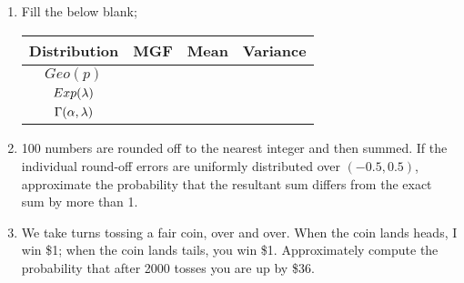 \documentclass[12pt]{article}%
\newcommand{\0}{{\bf 0}}
\begin{document}
\begin{enumerate}
















\item
Fill the below blank;
{\small
\begin{table}[H]    \center
\begin{tabular}{|c|c|c|c|} \hline
Distribution&MGF&Mean&Variance\\ \hline \hline
$Geo(p)$&&&\\\hline
$Exp(\lambda)$&&&\\\hline
$\Gamma(\alpha,\lambda)$&&&\\\hline
\end{tabular}
\end{table}
}








\item
100 numbers are rounded off to the nearest integer and then summed. If the individual round-off errors are uniformly distributed over $(-0.5, 0.5)$, approximate the probability that the resultant sum differs from the exact sum by more than 1.








\item
We take turns tossing a fair coin, over and over. 
When the coin lands heads, I win \$1; when the coin lands tails, you win \$1. 
Approximately compute the probability that after 2000 tosses you are up by \$36.













\end{enumerate}
\end{document}
